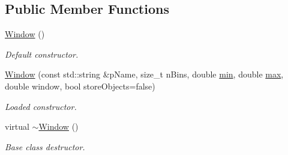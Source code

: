 \subsection*{Public Member Functions}
\begin{DoxyCompactItemize}
\item 
\hyperlink{classSlidingWindow_1_1Window_adaccac4f0906832d5417de50a82fb068}{Window} ()
\begin{DoxyCompactList}\small\item\em Default constructor. \end{DoxyCompactList}\item 
\hyperlink{classSlidingWindow_1_1Window_a4e940851f8491269fa36c267a94713c0}{Window} (const std\+::string \&p\+Name, size\+\_\+t n\+Bins, double \hyperlink{classSlidingWindow_1_1Window_a9f134cb80a395f11025c5d0fa1465852}{min}, double \hyperlink{classSlidingWindow_1_1Window_a57ad1e073130318a845129c8d92dae4c}{max}, double window, bool store\+Objects=false)
\begin{DoxyCompactList}\small\item\em Loaded constructor. \end{DoxyCompactList}\item 
virtual \hyperlink{classSlidingWindow_1_1Window_aeacafc20517bb5509871450e75151fca}{$\sim$\+Window} ()
\begin{DoxyCompactList}\small\item\em Base class destructor. \end{DoxyCompactList}\end{DoxyCompactItemize}
